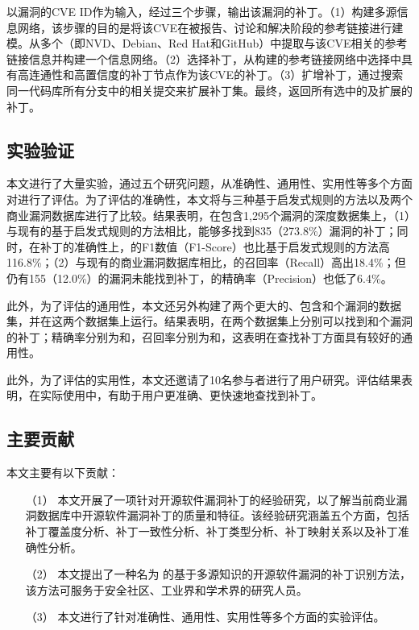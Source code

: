 \tool 以漏洞的CVE ID作为输入，经过三个步骤，输出该漏洞的补丁。（1）构建多源信息网络，该步骤的目的是将该CVE在被报告、讨论和解决阶段的参考链接进行建模。\tool 从多个（即NVD、Debian、Red Hat和GitHub）中提取与该CVE相关的参考链接信息并构建一个信息网络。（2）选择补丁，\tool 从构建的参考链接网络中选择中具有高连通性和高置信度的补丁节点作为该CVE的补丁。（3）扩增补丁，\tool 通过搜索同一代码库所有分支中的相关提交来扩展补丁集。最终，返回所有选中的及扩展的补丁。

\subsection{实验验证}
本文进行了大量实验，通过五个研究问题，从准确性、通用性、实用性等多个方面对\tool 进行了评估。为了评估\tool 的准确性，本文将\tool 与三种基于启发式规则的方法以及两个商业漏洞数据库进行了比较。结果表明，在包含1,295个漏洞的深度数据集上，（1）与现有的基于启发式规则的方法相比，\tool 能够多找到835（273.8\%）漏洞的补丁；同时，在补丁的准确性上，\tool 的F1数值（F1-Score）也比基于启发式规则的方法高116.8\%；（2）与现有的商业漏洞数据库相比，\tool 的召回率（Recall）高出18.4\%；但仍有155（12.0\%）的漏洞\tool 未能找到补丁，\tool 的精确率（Precision）也低了6.4\%。%

此外，为了评估\tool 的通用性，本文还另外构建了两个更大的、包含和个漏洞的数据集，并在这两个数据集上运行\tool 。结果表明，\tool 在两个数据集上分别可以找到和个漏洞的补丁；精确率分别为和，召回率分别为和，这表明\tool 在查找补丁方面具有较好的通用性。

此外，为了评估\tool 的实用性，本文还邀请了10名参与者进行了用户研究。评估结果表明，在实际使用中，\tool 有助于用户更准确、更快速地查找到补丁。

\subsection{主要贡献}
本文主要有以下贡献：
\begin{enumerate}
\item [（1）]本文开展了一项针对开源软件漏洞补丁的经验研究，以了解当前商业漏洞数据库中开源软件漏洞补丁的质量和特征。该经验研究涵盖五个方面，包括补丁覆盖度分析、补丁一致性分析、补丁类型分析、补丁映射关系以及补丁准确性分析。
\item [（2）]本文提出了一种名为 \tool 的基于多源知识的开源软件漏洞的补丁识别方法，该方法可服务于安全社区、工业界和学术界的研究人员。
\item [（3）]本文进行了针对\tool 准确性、通用性、实用性等多个方面的实验评估。
\end{enumerate}


